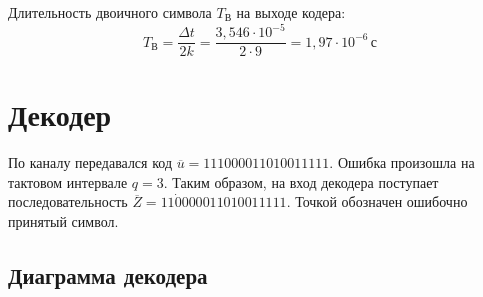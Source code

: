 \documentclass[a4paper, 12pt]{article}
\begin{document}
Длительность двоичного символа \(T_В\) на выходе кодера:
\[T_В=\frac{\Delta t}{2k}=\frac{3,546\cdot 10^{-5}}{2\cdot 9}=
1,97\cdot 10^{-6}\,с\]

\section{Декодер}
По каналу передавался код \(\overline{u}=11 10 00 01 10 10 01 11 11\).
Ошибка произошла на тактовом интервале \(q=3\).
Таким образом, на вход декодера поступает последовательность 
\(\overline{Z}=11 \dot{0}0 00 01 10 10 01 11 11\). Точкой обозначен ошибочно принятый символ.

\subsection{Диаграмма декодера}

\end{document}
